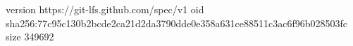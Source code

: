 version https://git-lfs.github.com/spec/v1
oid sha256:77c95c130b2bcde2ca21d2da3790dde0e358a631ce88511c3ac6f96b028503fc
size 349692
